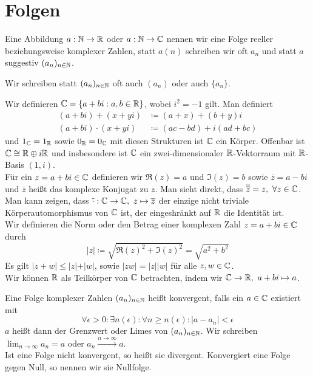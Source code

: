 \section{Folgen}
    \begin{defn}
        Eine Abbildung $a:\mathbb{N} \to \mathbb{R}$ oder $a:\mathbb{N}\to \mathbb{C}$ nennen wir eine Folge reeller beziehungsweise komplexer Zahlen, statt
        $a(n)$ schreiben wir oft $a_n$ und statt $a$ suggestiv $(a_n)_{n\in \mathbb{N}}$.
    \end{defn}
    \begin{bem}
        Wir schreiben statt $(a_n)_{n\in \mathbb{N}}$ oft auch $(a_n)$ oder auch $\{a_n\}$.
    \end{bem}
    \begin{bem}
        Wir definieren $\mathbb{C}=\{a+bi : a,b\in \mathbb{R}\}$, wobei $i^2=-1$ gilt. Man definiert 
        \begin{align*}
            (a+bi)+(x+yi) &\coloneqq (a+x)+(b+y)i  \\
            (a+bi)\cdot (x+yi) &\coloneqq (ac-bd) +i(ad+bc) 
        \end{align*}
        und $1_{\mathbb{C}} = 1_{\mathbb{R}}$ sowie $0_{\mathbb{R}} = 0_{\mathbb{C}}$ mit diesen Strukturen ist $\mathbb{C}$ ein Körper. Offenbar ist $\mathbb{C} \cong \mathbb{R} \oplus i\mathbb{R}$ und insbesondere
        ist $\mathbb{C}$ ein zwei-dimensionaler $\mathbb{R}$-Vektorraum mit $\mathbb{R}$-Basis $(1,i)$. \\
        Für ein $z=a+bi\in \mathbb{C}$ definieren wir $\Re(z) = a$ und $\Im(z)=b$ sowie $\overline{z}=a-bi$ und $\overline{z}$ heißt das komplexe Konjugat zu $z$. Man sieht direkt, 
        dass $\overline{\overline{z}} = z, \ \forall z\in \mathbb{C}$. \\ 
        Man kann zeigen, dass $\overline{\cdot}:\mathbb{C}\to \mathbb{C}, \ z\mapsto \overline{z}$ der einzige nicht triviale Körperautomorphismus von $\mathbb{C}$ ist,
        der eingeshränkt auf $\mathbb{R}$ die Identität ist.  \\
        Wir definieren die Norm oder den Betrag einer komplexen Zahl $z=a+bi\in \mathbb{C}$ durch
        \[
            \vert z\vert \coloneqq \sqrt{\Re(z)^2+\Im(z)^2} = \sqrt{a^2+b^2}
        \] 
        Es gilt $\vert z+w\vert \le \vert z\vert +\vert w\vert$, sowie $\vert zw\vert = \vert z\vert\vert w\vert$ für alle $z,w\in \mathbb{C}$.
        \\ Wir können $\mathbb{R}$ als Teilkörper von $\mathbb{C}$ betrachten, indem wir $\mathbb{C} \to \mathbb{R}, \ a+bi\mapsto a$.
    \end{bem}
    \begin{defn}[Konvergenz]
        Eine Folge komplexer Zahlen $(a_n)_{n\in \mathbb{N}}$ heißt konvergent, falls ein $a\in \mathbb{C}$ existiert mit 
        \[
        \forall \epsilon > 0 :\exists n(\epsilon) : \forall n\ge n(\epsilon): \vert a-a_n\vert <\epsilon    
        \]
    $a$ heißt dann der Grenzwert oder Limes von $(a_n)_{n\in \mathbb{N}}$. Wir schreiben $\lim_{n\to\infty} a_n =a$ oder $a_n \xrightarrow{n\to \infty} a$. \\
    Ist eine Folge nicht konvergent, so heißt sie divergent. 
    Konvergiert eine Folge gegen Null, so nennen wir sie Nullfolge.
    \end{defn}
